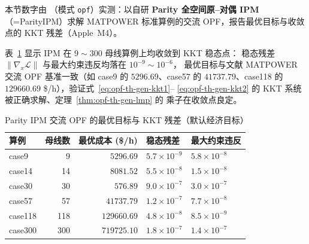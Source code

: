 本节数字由 （模式 \texttt{opf}）实测：以自研
\textbf{Parity 全空间原--对偶 IPM}（=ParityIPM）求解 MATPOWER
标准算例的交流 OPF，报告最优目标与收敛点的 KKT 残差（Apple~M4）。

表~\ref{tab:opf-th-gen-acopf} 显示 IPM 在 $9\sim300$ 母线算例上均收敛到 KKT 稳态点：
稳态残差 $\lVert\nabla_x\mathcal L\rVert$ 与最大约束违反均落在 $10^{-9}\sim10^{-6}$，
最优目标与文献 MATPOWER 交流 OPF 基准一致（如 case9 的 $5296.69$、case57 的
$41737.79$、case118 的 $129660.69$ \$/h），验证式~\eqref{eq:opf-th-gen-kkt1}--%
\eqref{eq:opf-th-gen-kkt2} 的 KKT 系统被正确求解、定理~\ref{thm:opf-th-gen-lmp} 的
乘子在收敛点良定。
\begin{table}[H]\centering\footnotesize
\caption{Parity IPM 交流 OPF 的最优目标与 KKT 残差（默认经济目标）}
\label{tab:opf-th-gen-acopf}
\begin{tabular}{@{}lrrll@{}}
\toprule
算例 & 母线数 & 最优成本 (\$/h) & 稳态残差 & 最大约束违反\\
\midrule
case9   & 9   & $5296.69$   & $5.7\times10^{-9}$ & $5.8\times10^{-8}$\\
case14  & 14  & $8081.52$   & $5.5\times10^{-8}$ & $1.5\times10^{-8}$\\
case30  & 30  & $576.89$    & $9.0\times10^{-7}$ & $3.0\times10^{-7}$\\
case57  & 57  & $41737.79$  & $1.2\times10^{-7}$ & $7.7\times10^{-8}$\\
case118 & 118 & $129660.69$ & $4.8\times10^{-8}$ & $8.5\times10^{-9}$\\
case300 & 300 & $719725.10$ & $1.8\times10^{-7}$ & $1.4\times10^{-7}$\\
\bottomrule
\end{tabular}
\end{table}

